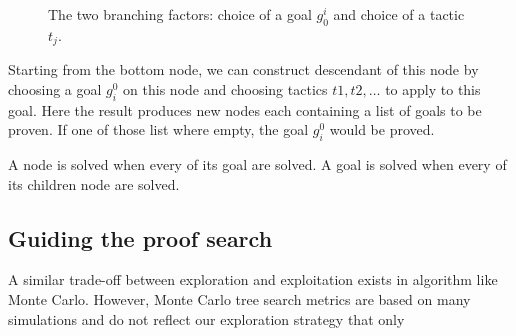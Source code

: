 \documentclass[runningheads,a4paper,draft]{svjour3}
\begin{document}
\begin{figure}{}
\begin{center}
\end{center}
\caption{The two branching factors: choice of a goal $g_0^i$ and choice of a 
tactic $t_j$.}
\label{fig:choice}
\end{figure}

Starting from the bottom node, we can construct descendant of this node by 
choosing a goal $g_i^0$ on this node and choosing tactics $t1,t2,\ldots$ to 
apply to this goal. Here the result produces new nodes each containing a list 
of goals to be proven. If one of those list where empty, the goal $g_i^0$ would 
be proved.


A node is solved when every of its goal are solved.
A goal is solved when every of its children node are solved.





\subsection{Guiding the proof search}

A similar trade-off between exploration and exploitation exists in algorithm 
like Monte Carlo. However, Monte Carlo tree search metrics are based on many 
simulations and do not reflect our exploration strategy that only 
\end{document}
